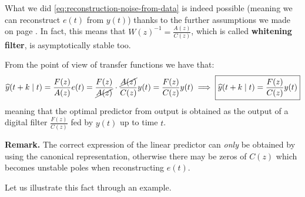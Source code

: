 
What we did \eqref{eq:reconstruction-noise-from-data} is indeed possible (meaning we can reconstruct $e(t)$ from $y(t)$) thanks to the further assumptions we made on page \pageref{assumptions-prediction-theory}. In fact, this means that $W(z)^{-1}=\frac{A(z)}{C(z)}$, which is called \textbf{whitening filter}, is asymptotically stable too.

From the point of view of transfer functions we have that:
\[
	\hat y (t+k\mid t) = \frac{F(z)}{A(z)}e(t) =\frac{F(z)}{\cancel{A(z)}}\cdot\frac{\cancel{A(z)}}{C(z)}y(t) =\frac{F(z)}{C(z)}y(t) \implies \boxed{\hat y (t+k\mid t) = \frac{F(z)}{C(z)}y(t)}
\]
meaning that the optimal predictor from output is obtained as the output of a digital filter $\frac{F(z)}{C(z)}$ fed by $y(t)$ up to time $t$.

\textbf{Remark.}
The correct expression of the linear predictor can \emph{only} be obtained by using the canonical representation, otherwise there may be zeros of $C(z)$ which becomes unstable poles when reconstructing $e(t)$.

Let us illustrate this fact through an example.


